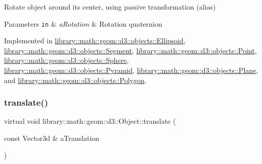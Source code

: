 Rotate object around its center, using passive transformation (alias) 


\begin{DoxyParams}[1]{Parameters}
\mbox{\tt in}  & {\em a\+Rotation} & Rotation quaternion \\
\hline
\end{DoxyParams}


Implemented in \hyperlink{classlibrary_1_1math_1_1geom_1_1d3_1_1objects_1_1_ellipsoid_abe9ead973befc80360179629fc96027a}{library\+::math\+::geom\+::d3\+::objects\+::\+Ellipsoid}, \hyperlink{classlibrary_1_1math_1_1geom_1_1d3_1_1objects_1_1_segment_a9d1693e80bd013a09334b9b7233abc2f}{library\+::math\+::geom\+::d3\+::objects\+::\+Segment}, \hyperlink{classlibrary_1_1math_1_1geom_1_1d3_1_1objects_1_1_point_a4e3c9900e358664fbdfe4d82c7fe40c1}{library\+::math\+::geom\+::d3\+::objects\+::\+Point}, \hyperlink{classlibrary_1_1math_1_1geom_1_1d3_1_1objects_1_1_sphere_a6eb8a0a7e27bf24d3f1101a6700f5247}{library\+::math\+::geom\+::d3\+::objects\+::\+Sphere}, \hyperlink{classlibrary_1_1math_1_1geom_1_1d3_1_1objects_1_1_pyramid_a06b022532e8477f4c4197e497113af99}{library\+::math\+::geom\+::d3\+::objects\+::\+Pyramid}, \hyperlink{classlibrary_1_1math_1_1geom_1_1d3_1_1objects_1_1_plane_a8dea00fbd8b29b1ac15574601cc1015b}{library\+::math\+::geom\+::d3\+::objects\+::\+Plane}, and \hyperlink{classlibrary_1_1math_1_1geom_1_1d3_1_1objects_1_1_polygon_a9c0c40a85f57ad69a59adc354181eec0}{library\+::math\+::geom\+::d3\+::objects\+::\+Polygon}.

\mbox{\label{classlibrary_1_1math_1_1geom_1_1d3_1_1_object_a989723a27a7d5f6739e45ea695a6c7ed}} 
\subsubsection{\texorpdfstring{translate()}{translate()}}
{\footnotesize\ttfamily virtual void library\+::math\+::geom\+::d3\+::\+Object\+::translate (\begin{DoxyParamCaption}\item[{const Vector3d \&}]{a\+Translation }\end{DoxyParamCaption})\hspace{0.3cm}{\ttfamily [pure virtual]}}



